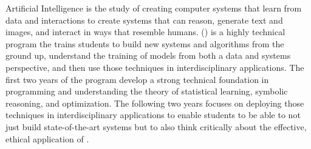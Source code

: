 Artificial Intelligence is the study of creating computer systems that
learn from data and interactions to create systems that can reason,
generate text and images, and interact in ways that resemble humans.
%
\name{} (\short{}) is a highly technical program the trains
students to build new \ai{} systems and algorithms from the ground up, understand the
training of models from both a data and systems perspective, and then
use those techniques in interdisciplinary applications.
%
The first two years of the program develop a strong technical
foundation in programming and understanding the theory of statistical
learning, symbolic reasoning, and optimization.
%
The following two years focuses on deploying those techniques in
interdisciplinary applications to enable students to be able to not
just build state-of-the-art \ai{} systems but to also think critically
about the effective, ethical application of \ai{}.